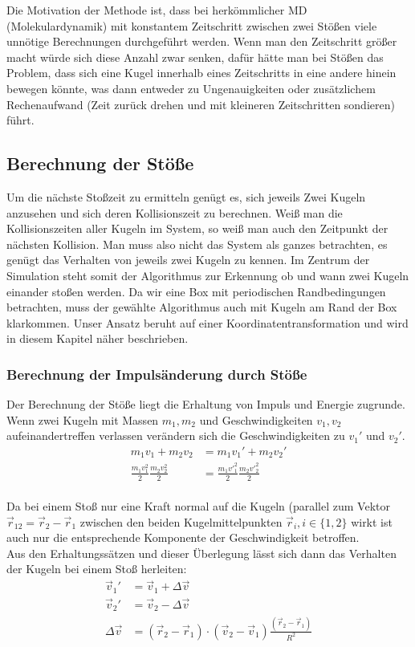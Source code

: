 Die Motivation der Methode ist, dass bei herkömmlicher MD (Molekulardynamik) mit konstantem Zeitschritt zwischen zwei Stößen viele unnötige Berechnungen durchgeführt werden. Wenn man den Zeitschritt größer macht würde sich diese Anzahl zwar senken, dafür hätte man bei Stößen das Problem, dass sich eine Kugel innerhalb eines Zeitschritts in eine andere hinein bewegen könnte, was dann entweder zu Ungenauigkeiten oder zusätzlichem Rechenaufwand (Zeit zurück drehen und mit kleineren Zeitschritten sondieren) führt.

\subsection{Berechnung der Stöße}
\newcommand{\reffig}[1]{Abbildung \ref{fig:#1}}

Um die nächste Stoßzeit zu ermitteln genügt es, sich jeweils Zwei Kugeln anzusehen und sich deren Kollisionszeit zu berechnen. Weiß man die Kollisionszeiten aller Kugeln im System, so weiß man auch den Zeitpunkt der nächsten Kollision. Man muss also nicht das System als ganzes betrachten, es genügt das Verhalten von jeweils zwei Kugeln zu kennen.
Im Zentrum der Simulation steht somit der Algorithmus zur Erkennung ob und wann zwei Kugeln einander stoßen werden. 
Da wir eine Box mit periodischen Randbedingungen betrachten, muss der gewählte Algorithmus auch mit Kugeln am Rand der Box klarkommen. Unser Ansatz beruht auf einer Koordinatentransformation und wird in diesem Kapitel näher beschrieben.





\subsubsection{Berechnung der Impulsänderung durch Stöße}
Der Berechnung der Stöße liegt die Erhaltung von Impuls und Energie zugrunde. Wenn zwei Kugeln mit Massen $m_1,m_2$ und Geschwindigkeiten $v_1,v_2$ aufeinandertreffen verlassen verändern sich die Geschwindigkeiten zu $v_1'$ und $v_2'$.
\begin{align*}
m_1v_1 + m_2v_2 &= m_1v_1'+m_2v_2'\\
\frac{m_1v^2_1}{2}\frac{m_2v^2_2}{2} &= \frac{m_1v'^2_1}{2}\frac{m_2v'^2_2}{2}
\end{align*}
\\
Da bei einem Stoß nur eine Kraft normal auf die Kugeln (parallel zum Vektor $\vec r_{12} = \vec r_2 - \vec r_1$  zwischen den beiden Kugelmittelpunkten $\vec r_i, i\in \{1,2\}$ wirkt ist auch nur die entsprechende Komponente der Geschwindigkeit betroffen.\\
Aus den Erhaltungssätzen und dieser Überlegung lässt sich dann das Verhalten der Kugeln bei einem Stoß herleiten:
\begin{align*}
\vec v_1' &= \vec v_1 + \Delta \vec v\\
\vec v_2'& = \vec v_2 - \Delta \vec v\\
\Delta\vec v &= \left(\vec r_2 - \vec r_1\right) \cdot \left(\vec v_2 - \vec v_1\right)\frac{\left(\vec r_2 - \vec r_1\right)}{R^2}
\end{align*}

